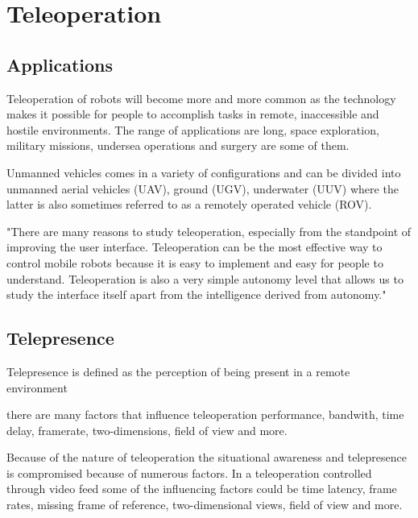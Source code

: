 

\section{Teleoperation}


\subsection{Applications}
Teleoperation of robots will become more and more common as the technology makes it possible for people to accomplish tasks in remote, inaccessible and hostile environments. The range of applications are long, space exploration, military missions, undersea operations and surgery are some of them.

Unmanned vehicles comes in a variety of configurations and can be divided into unmanned aerial vehicles (UAV), ground (UGV), underwater (UUV) where the latter is also sometimes referred to as a remotely operated vehicle (ROV).

\citep{Ricks2004} "There are many reasons to study teleoperation, especially from the standpoint of improving the user interface. Teleoperation can be the most effective way to control mobile robots because it is easy to implement and easy for people to understand. Teleoperation is also a very simple autonomy level that allows us to study the interface itself apart from the intelligence derived from autonomy."


\subsection{Telepresence}

Telepresence is defined as the perception of being present in a remote environment 

there are many factors that influence teleoperation performance, bandwith, time delay, framerate, two-dimensions, field of view and more. \citep{Chen2007}

Because of the nature of teleoperation the situational awareness and telepresence is compromised because of numerous factors. In a teleoperation controlled through video feed some of the influencing factors could be time latency, frame rates, missing frame of reference, two-dimensional views, field of view and more.

